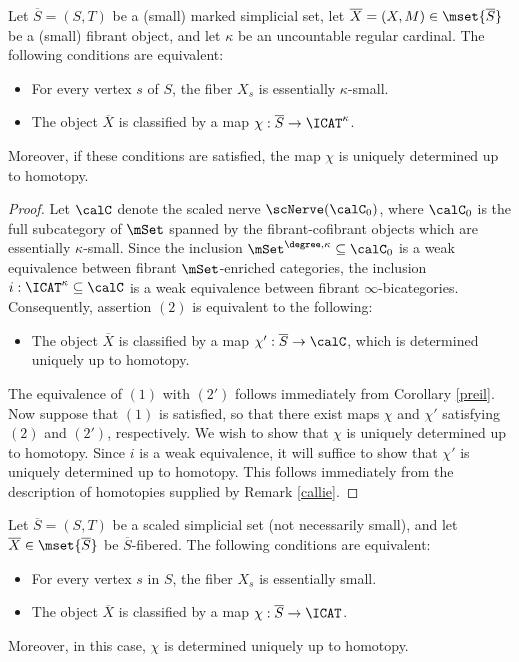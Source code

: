 \begin{corollary}\label{usqus}
Let $\overline{S} = (S,T)$ be a (small) marked simplicial set, let
$\overline{X} = (X,M)\in \mset{ \overline{S} }$ be a (small) fibrant object, and let $\kappa$ be an uncountable regular cardinal.
The following conditions are equivalent:
\begin{itemize}
\item[$(1)$] For every vertex $s$ of $S$, the fiber $X_{s}$ is essentially $\kappa$-small.
\item[$(2)$] The object $\overline{X}$ is classified by a map $\chi: \overline{S} \rightarrow \ICAT^{\kappa}$. 
\end{itemize}
Moreover, if these conditions are satisfied, the map $\chi$ is uniquely determined up to homotopy.
\end{corollary}

\begin{proof}
Let $\calC$ denote the scaled nerve $\scNerve(\calC_0)$, where $\calC_0$ is the full subcategory of
$\mSet$ spanned by the fibrant-cofibrant objects which are essentially $\kappa$-small.
Since the inclusion $\mSet^{\degree, \kappa} \subseteq \calC_0$ is a weak equivalence between fibrant $\mSet$-enriched categories, the inclusion $i: \ICAT^{\kappa} \subseteq \calC$ is
a weak equivalence between fibrant $\infty$-bicategories. Consequently, assertion
$(2)$ is equivalent to the following:
\begin{itemize}
\item[$(2')$] The object $\overline{X}$ is classified by a map $\chi': \overline{S} \rightarrow \calC$, which is determined uniquely up to homotopy. 
\end{itemize}
The equivalence of $(1)$ with $(2')$ follows immediately from Corollary \ref{preil}. Now suppose that $(1)$ is satisfied, so that there exist maps $\chi$ and $\chi'$ satisfying $(2)$ and $(2')$, respectively.
We wish to show that $\chi$ is uniquely determined up to homotopy. Since $i$ is a weak equivalence, it will suffice to show that $\chi'$ is uniquely determined up to homotopy. This follows immediately from the description of homotopies supplied by Remark \ref{callie}.
\end{proof}

\begin{corollary}
Let $\overline{S}=(S,T)$ be a scaled simplicial set (not necessarily small), and let
$\overline{X} \in \mset{ \overline{S}}$ be 
$\overline{S}$-fibered. The following conditions are equivalent:
\begin{itemize}
\item For every vertex $s$ in $S$, the fiber $X_{s}$ is essentially small.
\item The object $\overline{X}$ is classified by a map $\chi: \overline{S} \rightarrow \ICAT$.
\end{itemize}
Moreover, in this case, $\chi$ is determined uniquely up to homotopy.
\end{corollary}

